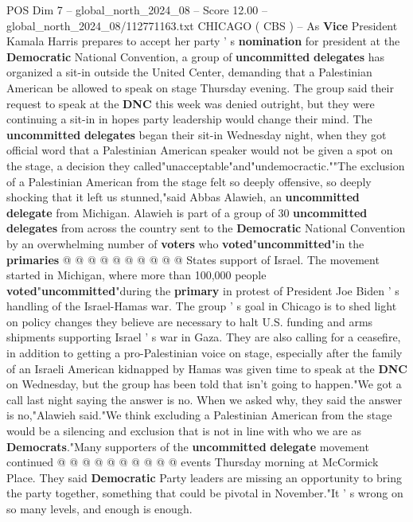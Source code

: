 \begin{textsample}{POS Dim 7 – global\_north\_2024\_08 – Score 12.00 – global\_north\_2024\_08/112771163.txt}  \label{ex:f7_pos_017}
CHICAGO ( CBS ) -- As \textbf{Vice} President Kamala Harris prepares to accept her party ' s \textbf{nomination} for president at the \textbf{Democratic} National Convention, a group of \textbf{uncommitted} \textbf{delegates} has organized a sit-in outside the United Center, demanding that a Palestinian American be allowed to speak on stage Thursday evening.
The group said their request to speak at the \textbf{DNC} this week was denied outright, but they were continuing a sit-in in hopes party leadership would change their mind.
The \textbf{uncommitted} \textbf{delegates} began their sit-in Wednesday night, when they got official word that a Palestinian American speaker would not be given a spot on the stage, a decision they called"unacceptable"and"undemocractic.""The exclusion of a Palestinian American from the stage felt so deeply offensive, so deeply shocking that it left us stunned,"said Abbas Alawieh, an \textbf{uncommitted} \textbf{delegate} from Michigan.
Alawieh is part of a group of 30 \textbf{uncommitted} \textbf{delegates} from across the country sent to the \textbf{Democratic} National Convention by an overwhelming number of \textbf{voters} who \textbf{voted}"\textbf{uncommitted}"in the \textbf{primaries} @ @ @ @ @ @ @ @ @ @ States support of Israel.
The movement started in Michigan, where more than 100,000 people \textbf{voted}"\textbf{uncommitted}"during the \textbf{primary} in protest of President Joe Biden ' s handling of the Israel-Hamas war.
The group ' s goal in Chicago is to shed light on policy changes they believe are necessary to halt U.S. funding and arms shipments supporting Israel ' s war in Gaza.
They are also calling for a ceasefire, in addition to getting a pro-Palestinian voice on stage, especially after the family of an Israeli American kidnapped by Hamas was given time to speak at the \textbf{DNC} on Wednesday, but the group has been told that isn't going to happen."We got a call last night saying the answer is no.
When we asked why, they said the answer is no,"Alawieh said."We think excluding a Palestinian American from the stage would be a silencing and exclusion that is not in line with who we are as \textbf{Democrats}."Many supporters of the \textbf{uncommitted} \textbf{delegate} movement continued @ @ @ @ @ @ @ @ @ @ events Thursday morning at McCormick Place.
They said \textbf{Democratic} Party leaders are missing an opportunity to bring the party together, something that could be pivotal in November."It ' s wrong on so many levels, and enough is enough.

\end{textsample}
